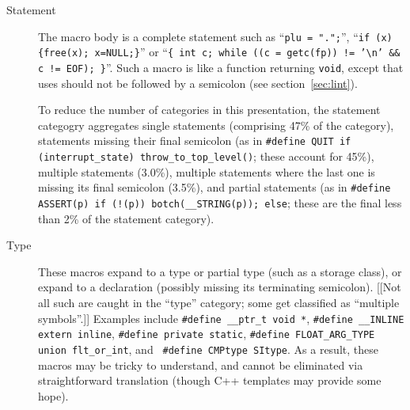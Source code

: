 \begin{description}
\item[Statement]\label{item:statement-category}
  The macro body is a complete statement such as
  ``{\tt plu = ".";}'', ``{\tt if (x) \verb|{|free(x); x=NULL;\verb|}|}'' or
    ``{\tt \verb|{| int c; while ((c = getc(fp)) != '\verb|\|n' \verb|&&| c != EOF);
    \verb|}|}''.  Such a macro is like a function 
    returning {\tt void}, except that uses should not be followed by a
    semicolon (see section~\ref{sec:lint}).
    
    To reduce the number of categories in this presentation, the statement
    categogry aggregates single statements (comprising 47\% of the category),
    statements missing their final semicolon (as in {\tt \#define QUIT if
    (\verb|interrupt_state|) \verb|throw_to_top_level|()}; these account
  for 45\%), multiple statements (3.0\%), multiple statements where the
  last one is missing its final semicolon (3.5\%), and partial statements
  (as in {\tt \#define ASSERT(p) if (!(p)) botch(\verb|__STRING|(p));
  else}; these are the final less than 2\% of the statement category).

\item[Type] 
  These macros expand to a type or partial type (such as a storage class),
  or expand to a declaration (possibly missing its terminating semicolon).
  [[Not all such are caught in the ``type'' category; some get classified
  as ``multiple symbols''.]]  Examples include {\tt \#define \verb|__ptr_t|
  void *}, {\tt \#define \verb|__INLINE| extern inline}, {\tt \#define
private static}, {\tt \#define \verb|FLOAT_ARG_TYPE| union \verb|flt_or_int|}, and {\tt
\#define CMPtype SItype}.  As a result, these macros may be tricky to
understand, and cannot be eliminated via straightforward translation
(though C++ templates may provide some hope).




\end{description}
